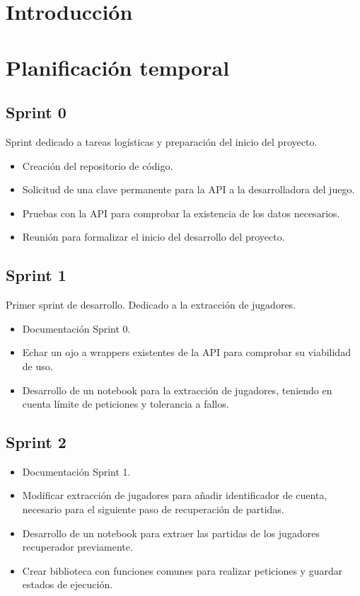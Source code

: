 
\section{Introducción}

\section{Planificación temporal}

\subsection{Sprint 0}

Sprint dedicado a tareas logísticas y preparación del inicio del proyecto.

\begin{itemize}
    \item Creación del repositorio de código.
    \item Solicitud de una clave permanente para la API a la desarrolladora del juego.
    \item Pruebas con la API para comprobar la existencia de los datos necesarios.
    \item Reunión para formalizar el inicio del desarrollo del proyecto.
\end{itemize}

\subsection{Sprint 1}

Primer sprint de desarrollo. Dedicado a la extracción de jugadores.

\begin{itemize}
    \item Documentación Sprint 0.
    \item Echar un ojo a wrappers existentes de la API para comprobar su viabilidad de uso.
    \item Desarrollo de un notebook para la extracción de jugadores, teniendo en cuenta límite de peticiones y tolerancia a fallos.
\end{itemize}

\subsection{Sprint 2}

\begin{itemize}
    \item Documentación Sprint 1.
    \item Modificar extracción de jugadores para añadir identificador de cuenta, necesario para el siguiente paso de recuperación de partidas.
    \item Desarrollo de un notebook para extraer las partidas de los jugadores recuperador previamente.
    \item Crear biblioteca con funciones comunes para realizar peticiones y guardar estados de ejecución.
\end{itemize}


